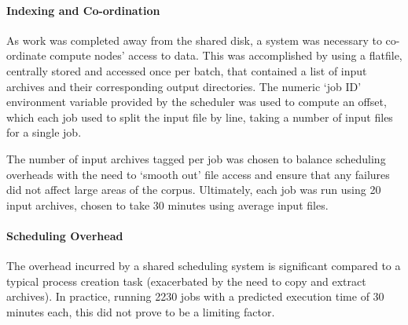 
\paragraph{Indexing and Co-ordination}
As work was completed away from the shared disk, a system was necessary to co-ordinate compute nodes' access to data.
This was accomplished by using a flatfile, centrally stored and accessed once per batch, that contained a list of input archives and their corresponding output directories.  
The numeric `job ID' environment variable provided by the scheduler was used to compute an offset, which each job used to split the input file by line, taking a number of input files for a single job.

The number of input archives tagged per job was chosen to balance scheduling overheads with the need to `smooth out' file access and ensure that any failures did not affect large areas of the corpus.  Ultimately, each job was run using 20 input archives, chosen to take 30 minutes using average input files.



\paragraph{Scheduling Overhead}
The overhead incurred by a shared scheduling system is significant compared to a typical process creation task (exacerbated by the need to copy and extract archives).  In practice, running 2230 jobs with a predicted execution time of 30 minutes each, this did not prove to be a limiting factor.








